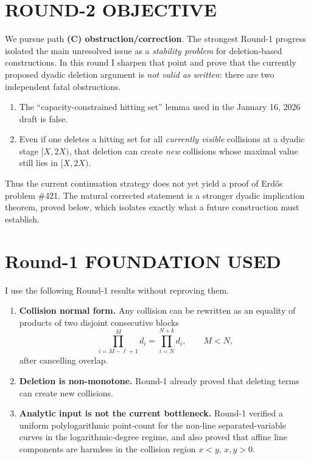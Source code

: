 \section{ROUND-2 OBJECTIVE}

We pursue path \textbf{(C) obstruction/correction}. The strongest Round-1 progress isolated the main unresolved issue as a \emph{stability problem} for deletion-based constructions. In this round I sharpen that point and prove that the currently proposed dyadic deletion argument is \emph{not valid as written}: there are two independent fatal obstructions.

\begin{enumerate}
\item The ``capacity-constrained hitting set'' lemma used in the January 16, 2026 draft is false.
\item Even if one deletes a hitting set for all \emph{currently visible} collisions at a dyadic stage $[X,2X)$, that deletion can create \emph{new} collisions whose maximal value still lies in $[X,2X)$.
\end{enumerate}

Thus the current continuation strategy does not yet yield a proof of Erd\H{o}s problem \#421. The natural corrected statement is a stronger dyadic implication theorem, proved below, which isolates exactly what a future construction must establish.

\section{Round-1 FOUNDATION USED}

I use the following Round-1 results without reproving them.

\begin{enumerate}
\item \textbf{Collision normal form.} Any collision can be rewritten as an equality of products of two disjoint consecutive blocks
\[
\prod_{i=M-\ell+1}^{M} d_i = \prod_{i=N}^{N+k} d_i,
\qquad M<N,
\]
after cancelling overlap.

\item \textbf{Deletion is non-monotone.} Round-1 already proved that deleting terms can create new collisions.

\item \textbf{Analytic input is not the current bottleneck.} Round-1 verified a uniform polylogarithmic point-count for the non-line separated-variable curves in the logarithmic-degree regime, and also proved that affine line components are harmless in the collision region $x<y$, $x,y>0$.
\end{enumerate}

